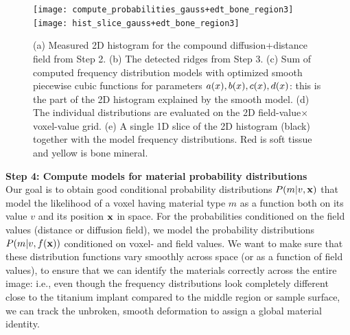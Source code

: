 \begin{figure}
  \centering
  \texttt{[image: compute\_probabilities\_gauss+edt\_bone\_region3]}\\
  \texttt{[image: hist\_slice\_gauss+edt\_bone\_region3]}\\
  \caption{
    (a) Measured 2D histogram for the compound diffusion+distance field from
    Step 2. (b) The detected ridges from Step 3. (c) Sum of computed frequency
    distribution models with optimized smooth piecewise cubic functions for
    parameters $a(x), b(x), c(x), d(x)$: this is the part of
    the 2D histogram explained by the smooth model. (d) The individual
    distributions are evaluated on the 2D field-value$\times$ voxel-value grid.
    (e) A single 1D slice of the 2D histogram (black) together with the model
    frequency distributions. Red is soft tissue and yellow is bone mineral.
  }
  \label{fig:curves-and-more}
\end{figure}

\vspace{\baselineskip}
\noindent\textbf{Step 4: Compute models for material probability distributions} \\
Our goal is to obtain good conditional probability distributions
$P\!\left(m\middle\vert v,\mathbf{x}\right)$ that model the likelihood of a voxel having material type $m$
as a function both on its value $v$ and its position $\mathbf{x}$ in space. For the
probabilities conditioned on the field values (distance or diffusion field), we
model the probability distributions $P\!\left(m\middle\vert v,f(\mathbf{x})\right)$ conditioned on voxel-
and field values. We want to make sure that these distribution functions vary
smoothly across space (or as a function of field values), to ensure that we can
identify the materials correctly across the entire image: i.e., even though the
frequency distributions look completely different close to the titanium implant
compared to the middle region or sample surface, we can track the unbroken,
smooth deformation to assign a global material identity.

